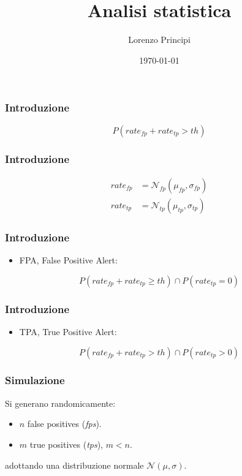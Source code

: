 \documentclass{beamer}
\title{Analisi statistica}
\author{Lorenzo Principi}
\date{\today}
\begin{document}
\frame{\titlepage}

\begin{frame}
    \frametitle{Introduzione}

    \begin{equation}
        P(rate_{fp} + rate_{tp} > th)
    \end{equation}

\end{frame}



\begin{frame}
    \frametitle{Introduzione}

    \begin{align}
        rate_{fp} &= \mathcal{N}_{fp}(\mu_{fp}, \sigma_{fp}) \\
        rate_{tp} &= \mathcal{N}_{tp}(\mu_{tp}, \sigma_{tp})
    \end{align}
    
\end{frame}



\begin{frame}
    \frametitle{Introduzione}
    \begin{itemize}
        \item FPA, False Positive Alert:
    \end{itemize}

    \begin{equation}
        P(rate_{fp} + rate_{tp} \ge th) \cap P(rate_{tp} = 0)
    \end{equation}
\end{frame}



\begin{frame}
    \frametitle{Introduzione}
    \begin{itemize}
        \item TPA, True Positive Alert:
    \end{itemize}

    \begin{equation}
        P(rate_{fp} + rate_{tp} > th) \cap P(rate_{tp} > 0)
    \end{equation}
\end{frame}






\begin{frame}
    \frametitle{Simulazione}
    Si generano randomicamente:
    \begin{itemize}
        \item $n$ false positives (\textit{fps}).
        \item $m$ true positives (\textit{tps}), $m < n$.
    \end{itemize}
    adottando una distribuzione normale $\mathcal{N}(\mu,\sigma)$.
\end{frame}
\end{document}
